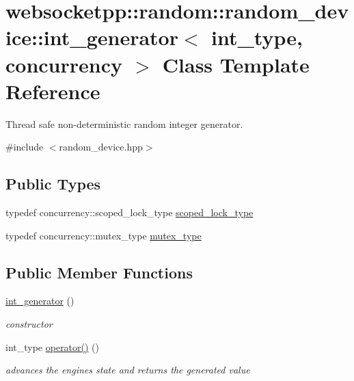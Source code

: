 \hypertarget{classwebsocketpp_1_1random_1_1random__device_1_1int__generator}{}\section{websocketpp\+:\+:random\+:\+:random\+\_\+device\+:\+:int\+\_\+generator$<$ int\+\_\+type, concurrency $>$ Class Template Reference}
\label{classwebsocketpp_1_1random_1_1random__device_1_1int__generator}


Thread safe non-\/deterministic random integer generator.  




{\ttfamily \#include $<$random\+\_\+device.\+hpp$>$}

\subsection*{Public Types}
\begin{DoxyCompactItemize}
\item 
typedef concurrency\+::scoped\+\_\+lock\+\_\+type \hyperlink{classwebsocketpp_1_1random_1_1random__device_1_1int__generator_a7702456f8c753025bb52db190bfa04b3}{scoped\+\_\+lock\+\_\+type}
\item 
typedef concurrency\+::mutex\+\_\+type \hyperlink{classwebsocketpp_1_1random_1_1random__device_1_1int__generator_a76479f1088f245508e7efce66b3ab51c}{mutex\+\_\+type}
\end{DoxyCompactItemize}
\subsection*{Public Member Functions}
\begin{DoxyCompactItemize}
\item 
\hyperlink{classwebsocketpp_1_1random_1_1random__device_1_1int__generator_ac1752f1f3cb1c3cb6a98e252b6baac8a}{int\+\_\+generator} ()
\begin{DoxyCompactList}\small\item\em constructor \end{DoxyCompactList}\item 
int\+\_\+type \hyperlink{classwebsocketpp_1_1random_1_1random__device_1_1int__generator_a6e4fea3c83b876cc364f9d9370b0c5a1}{operator()} ()
\begin{DoxyCompactList}\small\item\em advances the engine\textquotesingle{}s state and returns the generated value \end{DoxyCompactList}\end{DoxyCompactItemize}


